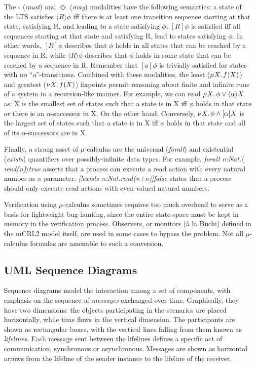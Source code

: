 \documentclass[letter]{llncs}
\begin{document}
The $\square$ (\emph{must}) and $\Diamond$ (\emph{may}) modalities  have the following semantics:
a state of the LTS satisfies $\langle R \rangle\phi$ iff there is at least one transition sequence 
starting at that state, satisfying R, and leading to a state satisfying $\phi$;
$[R]\phi$ is satisfied iff all sequences starting at that state and satisfying R, 
lead to states satisfying  $\phi$.
In other words, $[R]\phi$ describes that $\phi$ holds in all states that can be reached by a sequence in R,
while $\langle R \rangle\phi$ describes that $\phi$ holds in some state that can be reached by a sequence in R.
Remember that $[a]\phi$ is trivially satisfied for states with no “\emph{a}”-transitions.
Combined with these modalities, the least ($\mu X\ldotp f(X)$) and greatest
($\nu X\ldotp f(X)$) fixpoints permit reasoning about finite and infinite runs
of a system in a recursion-like manner.
For example, we can read $\mu X\ldotp\phi\vee\langle\alpha\rangle X$ as: X is
the smallest set of states such that a state is in X
iff $\phi$ holds in that state or there is an $\alpha$-successor in X. 
On the other hand, 
Conversely, $\nu X\ldotp\phi \wedge[\alpha]X$ is the largest set of states such that a state is in X iff
$\phi$ holds in that state and all of its $\alpha$-successors are in X.

Finally, a strong asset of $\mu$-calculus are the universal (\emph{forall}) and existential (\emph{exists}) quantifiers over possibly-infinite data types.
For example, \emph{forall n:Nat.$\langle$read(n)$\rangle$true} asserts that a process can execute a read action with every natural number as a parameter;
\emph{[!exists n:Nat.read(n+n)]false} states that a process should only execute read actions with even-valued natural numbers.

Verification using $\mu$-calculus sometimes requires too much overhead to serve as a basis for lightweight 
bug-hunting, since the entire state-space must be kept in memory in the verification process.
Observers, or monitors (\`{a} la Buchi) defined in the mCRL2 model itself, are used in some cases to bypass the problem.
Not all $\mu$-calculus formulas are amenable to such a conversion.

\subsection{UML Sequence Diagrams}

Sequence diagrams model the interaction among a set of components, with
emphasis on the sequence of \emph{messages} exchanged over time. Graphically, they have
two dimensions: the objects participating in the scenarios are placed horizontally, 
while time flows in the vertical dimension. The participants are shown as rectangular boxes, with the vertical lines
falling from them known as \emph{lifelines}. 
Each message sent between the lifelines defines a specific act of communication, synchronous or asynchronous.
Messages are shown as horizontal arrows from the lifeline of the sender instance to the lifeline of the receiver. 
\end{document}
